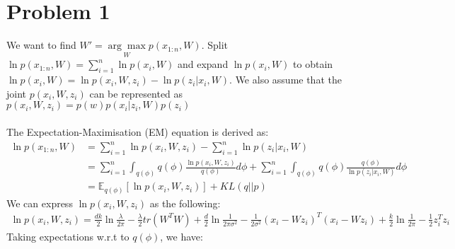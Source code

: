 \documentclass[twoside]{homework}
\begin{document}
\maketitle

\section*{Problem 1}
We want to find $W' = \underset{W}{\arg\max} p(x_{1:n}, W)$. Split $\ln p(x_{1:n}, W) = \sum_{i=1}^n \ln p(x_{i}, W)$ and expand $\ln p(x_{i}, W)$ to obtain $\ln p(x_{i}, W) = \ln p(x_{i}, W, z_i) - \ln p(z_i | x_{i}, W)$. We also assume that the joint $p(x_{i}, W, z_i)$ can be represented as $p(x_{i}, W, z_i) = p(w) p(x_i | z_i, W) p(z_i)$
\\ \\
The Expectation-Maximisation (EM) equation is derived as:
\begin{align*}
\ln p(x_{1:n}, W) 
&= \sum_{i=1}^n \ln p(x_{i}, W, z_i) - \sum_{i=1}^n \ln p(z_i | x_{i}, W) \\
&= \sum_{i=1}^n \int_{q(\phi)} q(\phi) \frac{\ln p(x_{i}, W, z_i)}{q(\phi)} d\phi +  \sum_{i=1}^n \int_{q(\phi)} q(\phi) \frac{q(\phi)}{\ln p(z_i | x_{i}, W)} d\phi \\
&= \mathbb{E}_{q(\phi)} [\ln p(x_i, W, z_i)] + KL(q || p)
\end{align*}
We can express $\ln p(x_{i}, W, z_i)$ as the following:
\begin{align*}
\ln p(x_{i}, W, z_i) = \frac{dk}{2}\ln \frac{\lambda}{2\pi} - \frac{\lambda}{2} tr(W^T W)+ \frac{d}{2}\ln \frac{1}{2\pi \sigma^2} - \frac{1}{2 \sigma^2}(x_i - Wz_i)^T (x_i - Wz_i) + \frac{k}{2}\ln \frac{1}{2\pi} - \frac{1}{2}z_i^T z_i
\end{align*}
Taking expectations w.r.t to $q(\phi)$, we have:
\end{document}
